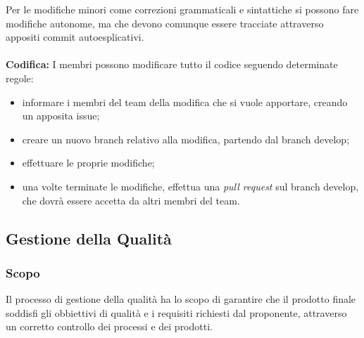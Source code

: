 Per le modifiche minori come correzioni grammaticali e sintattiche si possono fare modifiche autonome, ma che devono comunque essere tracciate attraverso appositi commit autoesplicativi.\\
\vspace{0px}\\
\textbf{Codifica:}
I membri possono modificare tutto il codice seguendo determinate regole:
\begin{itemize}
    \renewcommand\labelitemi{-}
    \item informare i membri del team della modifica che si vuole apportare, creando un apposita issue;
    \item creare un nuovo branch relativo alla modifica, partendo dal branch develop;
    \item effettuare le proprie modifiche;
    \item una volte terminate le modifiche, effettua una \textit{pull request} sul branch develop, che dovrà essere accetta da  altri membri del team.
\end{itemize}
\subsection{Gestione della Qualità}
\subsubsection{Scopo}
Il processo di gestione della qualità ha lo scopo di garantire che il prodotto finale soddisfi gli obbiettivi di qualità e i requisiti richiesti dal proponente, attraverso un corretto controllo dei processi e dei prodotti.
